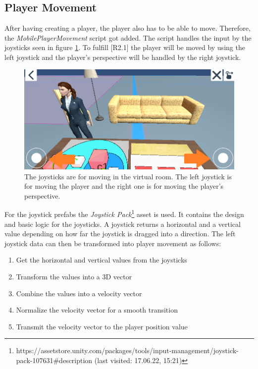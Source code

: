 \subsection{Player Movement}
After having creating a player, the player also has to be able to move.
Therefore, the \textit{MobilePlayerMovement} script got added.
The script handles the input by the joysticks seen in figure \ref{fig:joystick}.
To fulfill [R2.1] the player will be moved by using the left joystick and the player's perspective will be handled by the right joystick.

\begin{figure}[htb]
    \centering
    \includegraphics[width=1\textwidth]{Implementation/img/joysticks.png}
    \caption{The joysticks are for moving in the virtual room. The left joystick is for moving the player and the right one is for moving the player's perspective.}\label{fig:joystick}
\end{figure}

For the joystick \glspl{prefab} the \textit{Joystick Pack}\footnote{https://assetstore.unity.com/packages/tools/input-management/joystick-pack-107631\#description (last visited: 17.06.22, 15:21)} \gls{asset} is used.
It contains the design and basic logic for the joysticks.
A joystick returns a horizontal and a vertical value depending on how far the joystick is dragged into a direction.
The left joystick data can then be transformed into player movement as follows:
\begin{enumerate}
    \item Get the horizontal and vertical values from the joysticks
    \item Transform the values into a 3D vector
    \item Combine the values into a velocity vector
    \item Normalize the velocity vector for a smooth transition
    \item Transmit the velocity vector to the player position value
\end{enumerate}

